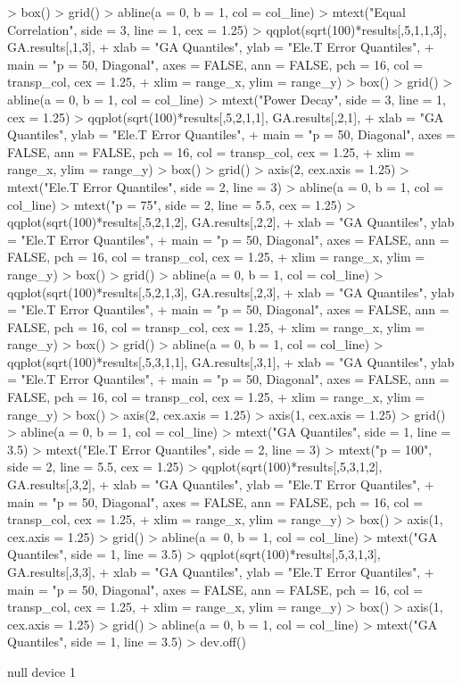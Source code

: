 \documentclass{article}
\begin{document}
\begin{Schunk}
\begin{Sinput}
> box()
> grid()
> abline(a = 0, b = 1, col = col_line)
> mtext("Equal Correlation", side = 3, line = 1, cex = 1.25)
> qqplot(sqrt(100)*results[,5,1,1,3], GA.results[,1,3],
+        xlab = "GA Quantiles", ylab = "Ele.T Error Quantiles",
+        main = "p = 50, Diagonal", axes = FALSE, ann = FALSE, pch = 16, col = transp_col, cex = 1.25,
+        xlim = range_x, ylim = range_y)
> box()
> grid()
> abline(a = 0, b = 1, col = col_line)
> mtext("Power Decay", side = 3, line = 1, cex = 1.25)
> qqplot(sqrt(100)*results[,5,2,1,1], GA.results[,2,1],
+        xlab = "GA Quantiles", ylab = "Ele.T Error Quantiles",
+        main = "p = 50, Diagonal", axes = FALSE, ann = FALSE, pch = 16, col = transp_col, cex = 1.25,
+        xlim = range_x, ylim = range_y)
> box()
> grid()
> axis(2, cex.axis = 1.25)
> mtext("Ele.T Error Quantiles", side = 2, line = 3)
> abline(a = 0, b = 1, col = col_line)
> mtext("p = 75", side = 2, line = 5.5, cex = 1.25)
> qqplot(sqrt(100)*results[,5,2,1,2], GA.results[,2,2],
+        xlab = "GA Quantiles", ylab = "Ele.T Error Quantiles",
+        main = "p = 50, Diagonal", axes = FALSE, ann = FALSE, pch = 16, col = transp_col, cex = 1.25,
+        xlim = range_x, ylim = range_y)
> box()
> grid()
> abline(a = 0, b = 1, col = col_line)
> qqplot(sqrt(100)*results[,5,2,1,3], GA.results[,2,3],
+        xlab = "GA Quantiles", ylab = "Ele.T Error Quantiles",
+        main = "p = 50, Diagonal", axes = FALSE, ann = FALSE, pch = 16, col = transp_col, cex = 1.25,
+        xlim = range_x, ylim = range_y)
> box()
> grid()
> abline(a = 0, b = 1, col = col_line)
> qqplot(sqrt(100)*results[,5,3,1,1], GA.results[,3,1],
+        xlab = "GA Quantiles", ylab = "Ele.T Error Quantiles",
+        main = "p = 50, Diagonal", axes = FALSE, ann = FALSE, pch = 16, col = transp_col, cex = 1.25,
+        xlim = range_x, ylim = range_y)
> box()
> axis(2, cex.axis = 1.25)
> axis(1, cex.axis = 1.25)
> grid()
> abline(a = 0, b = 1, col = col_line)
> mtext("GA Quantiles", side = 1, line = 3.5)
> mtext("Ele.T Error Quantiles", side = 2, line = 3)
> mtext("p = 100", side = 2, line = 5.5, cex = 1.25)
> qqplot(sqrt(100)*results[,5,3,1,2], GA.results[,3,2],
+        xlab = "GA Quantiles", ylab = "Ele.T Error Quantiles",
+        main = "p = 50, Diagonal", axes = FALSE, ann = FALSE, pch = 16, col = transp_col, cex = 1.25,
+        xlim = range_x, ylim = range_y)
> box()
> axis(1, cex.axis = 1.25)
> grid()
> abline(a = 0, b = 1, col = col_line)
> mtext("GA Quantiles", side = 1, line = 3.5)
> qqplot(sqrt(100)*results[,5,3,1,3], GA.results[,3,3],
+        xlab = "GA Quantiles", ylab = "Ele.T Error Quantiles",
+        main = "p = 50, Diagonal", axes = FALSE, ann = FALSE, pch = 16, col = transp_col, cex = 1.25,
+        xlim = range_x, ylim = range_y)
> box()
> axis(1, cex.axis = 1.25)
> grid()
> abline(a = 0, b = 1, col = col_line)
> mtext("GA Quantiles", side = 1, line = 3.5)
> dev.off()
\end{Sinput}
\begin{Soutput}
null device 
          1 
\end{Soutput}
\end{Schunk}

\begin{figure}

\end{figure}
\end{document}
